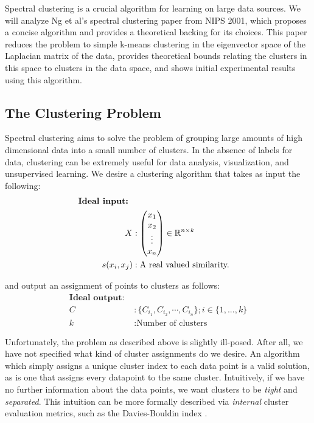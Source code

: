 Spectral clustering is a crucial algorithm for learning on large data sources.
We will analyze Ng et al's \cite{ng2002spectral} spectral clustering paper from
NIPS 2001, which proposes a concise algorithm and provides a theoretical
backing for its choices. This paper reduces the problem to simple k-means
clustering in the eigenvector space of the Laplacian matrix of the data,
provides theoretical bounds relating the clusters in this space to clusters in
the data space, and shows initial experimental results using this algorithm.

\subsection{The Clustering Problem}
Spectral clustering aims to solve the problem of grouping large amounts of high
dimensional data into a small number of clusters. In the absence of labels for
data, clustering can be extremely useful for data analysis, visualization, and
unsupervised learning. We desire a clustering algorithm that takes as input the
following:
\begin{align*}
\textbf{Ideal input: } \label{clustering:idealinput} \\
X &: \begin{pmatrix}
        x_1 \\
        x_2 \\
        \vdots \\
        x_n
     \end{pmatrix} \in \mathbb{R}^{n \times k} \\
s(x_i, x_j) &: \text{A real valued similarity.}
\end{align*}

and output an assignment of points to clusters as follows:
\begin{align*}
    \textbf{Ideal output: } \\
C &: \{ C_{i_1}, C_{i_2}, \cdots, C_{i_n} \} ; i \in \{1,...,k\} \\
k &: \text{Number of clusters}
\end{align*}

Unfortunately, the problem as described above is slightly ill-posed.
After all, we have not specified what kind of cluster assignments do we desire.
An algorithm which simply assigns a unique cluster index to each data point is
a valid solution, as is one that assigns every datapoint to the same cluster.
Intuitively, if we have no further information about the data points, we want
clusters to be \textit{tight} and \textit{separated}. This intuition can be more
formally described via \textit{internal} cluster evaluation metrics, such as the
Davies-Bouldin index \cite{davies1979cluster}.

